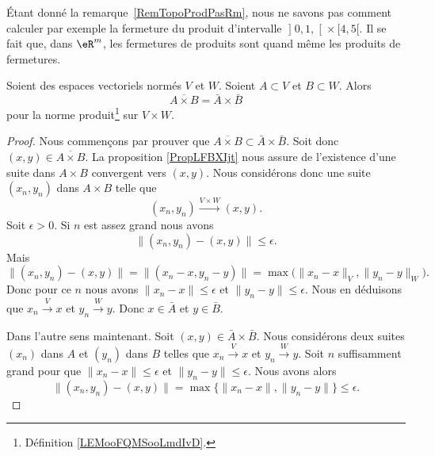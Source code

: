 Étant donné la remarque~\ref{RemTopoProdPasRm}, nous ne savons pas comment calculer par exemple la fermeture du produit d'intervalle \( \mathopen] 0,1 ,  \mathclose[\times\mathopen[ 4 , 5 [\). Il se fait que, dans \( \eR^m\), les fermetures de produits sont quand même les produits de fermetures.

\begin{proposition}     \label{PropovlAxBbarAbraB}
	Soient des espaces vectoriels normés \( V\) et \( W\). Soient \( A\subset V\) et \( B\subset W\). Alors
	\begin{equation}
		\overline{ A\times B }=\bar A\times \bar B
	\end{equation}
	pour la norme produit\footnote{Définition \ref{LEMooFQMSooLmdIvD}.} sur \( V\times W\).
\end{proposition}

\begin{proof}
	Nous commençons par prouver que \( \overline{ A\times B }\subset \bar A\times \bar B\). Soit donc \( (x,y)\in\overline{ A\times B }\). La proposition \ref{PropLFBXIjt} nous assure de l'existence d'une suite dans \( A\times B\) convergent vers \( (x,y)\). Nous considérons donc une suite \( (x_n,y_n)\) dans \( A\times B\) telle que
	\begin{equation}
		(x_n,y_n)\stackrel{V\times W}{\longrightarrow}(x,y).
	\end{equation}
	Soit \( \epsilon>0\). Si \( n\) est assez grand nous avons
	\begin{equation}
		\| (x_n,y_n)-(x,y) \|\leq \epsilon.
	\end{equation}
	Mais
	\begin{equation}
		\| (x_n,y_n)-(x,y) \|=\| (x_n-x,y_n-y) \|=\max\big( \| x_n-x \|_V,\| y_n-y \|_W \big).
	\end{equation}
	Donc pour ce \( n\) nous avons \( \| x_n-x \|\leq \epsilon\) et \( \| y_n-y \|\leq \epsilon\). Nous en déduisons que \( x_n\stackrel{V}{\longrightarrow}x\) et \( y_n\stackrel{W}{\longrightarrow}y\). Donc \( x\in \bar A\) et \( y\in\bar B\).

	Dans l'autre sens maintenant. Soit \( (x,y)\in\bar A\times \bar B\). Nous considérons deux suites \( (x_n)\) dans \( A\) et \( (y_n)\) dans \( B\) telles que \( x_n\stackrel{V}{\longrightarrow}x\) et \( y_n\stackrel{W}{\longrightarrow}y\). Soit \( n\) suffisamment grand pour que \( \| x_n-x \|\leq \epsilon\) et \( \| y_n-y \|\leq \epsilon\). Nous avons alors
	\begin{equation}
		\| (x_n,y_n)-(x,y) \|=\max\{ \| x_n-x \|,\| y_n-y \| \}\leq \epsilon.
	\end{equation}
\end{proof}


